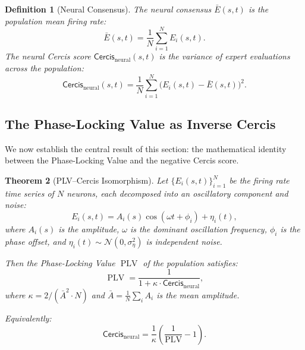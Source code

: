 \documentclass[12pt,a4paper]{article}
\newtheorem{theorem}{Theorem}[section]
\newtheorem{definition}[theorem]{Definition}
\theoremstyle{remark}
\newcommand{\Cercis}{\textsf{Cercis}}
\DeclareMathOperator{\PLV}{PLV}
\begin{document}
\begin{definition}[Neural Consensus]\label{def:neural-consensus}
The neural consensus $\bar{E}(s, t)$ is the population mean firing rate:
\begin{equation}\label{eq:neural-consensus-def}
    \bar{E}(s, t) = \frac{1}{N} \sum_{i=1}^{N} E_i(s, t).
\end{equation}
The neural \Cercis{} score $\Cercis_{\text{neural}}(s, t)$ is the
variance of expert evaluations across the population:
\begin{equation}\label{eq:neural-cercis}
    \Cercis_{\text{neural}}(s, t) = \frac{1}{N} \sum_{i=1}^{N} \big(E_i(s, t) - \bar{E}(s, t)\big)^2.
\end{equation}
\end{definition}

\subsection{The Phase-Locking Value as Inverse Cercis}

We now establish the central result of this section: the mathematical identity
between the Phase-Locking Value and the negative \Cercis{} score.

\begin{theorem}[PLV--Cercis Isomorphism]\label{thm:plv-cercis}
Let $\{E_i(s, t)\}_{i=1}^{N}$ be the firing rate time series of $N$ neurons,
each decomposed into an oscillatory component and noise:
\begin{equation}\label{eq:osc-decomp}
    E_i(s, t) = A_i(s) \cos(\omega t + \phi_i) + \eta_i(t),
\end{equation}
where $A_i(s)$ is the amplitude, $\omega$ is the dominant oscillation frequency,
$\phi_i$ is the phase offset, and $\eta_i(t) \sim \mathcal{N}(0, \sigma_\eta^2)$
is independent noise.

Then the Phase-Locking Value $\PLV$ of the population satisfies:
\begin{equation}\label{eq:plv-cercis-formula}
    \PLV = \frac{1}{1 + \kappa \cdot \Cercis_{\text{neural}}},
\end{equation}
where $\kappa = 2 / (\bar{A}^2 \cdot N)$ and $\bar{A} = \frac{1}{N}\sum_i A_i$
is the mean amplitude.

Equivalently:
\begin{equation}\label{eq:cercis-plv-inverse}
    \Cercis_{\text{neural}} = \frac{1}{\kappa} \left( \frac{1}{\PLV} - 1 \right).
\end{equation}
\end{theorem}
\end{document}
